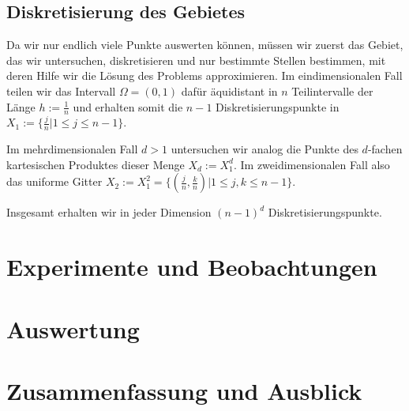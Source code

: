 \documentclass{scrartcl}
\begin{document}
\subsection{Diskretisierung des Gebietes}
Da wir nur endlich viele Punkte auswerten können, müssen wir zuerst das Gebiet, das wir untersuchen, diskretisieren und nur bestimmte Stellen bestimmen, mit deren Hilfe wir die Lösung des Problems approximieren.
Im eindimensionalen Fall teilen wir das Intervall $\Omega=(0,1)$ dafür äquidistant in $n$ Teilintervalle der Länge $h:=\frac{1}{n}$ und erhalten somit die $n-1$ Diskretisierungspunkte in
$X_1:=\{\frac{j}{n} | 1\leq j \leq n-1\}$.

Im mehrdimensionalen Fall $d>1$ untersuchen wir analog die Punkte des $d$-fachen kartesischen Produktes dieser Menge $X_d := X_1^d$. Im zweidimensionalen Fall also das uniforme Gitter $X_2 := X_1^2 = \{(\frac{j}{n}, \frac{k}{n}) | 1\leq j,k \leq n-1\}$.

Insgesamt erhalten wir in jeder Dimension $(n-1)^d$ Diskretisierungspunkte.

\pagebreak
\section{Experimente und Beobachtungen}


\pagebreak
\section{Auswertung}

\pagebreak
\section{Zusammenfassung und Ausblick}

\pagebreak


\end{document}
